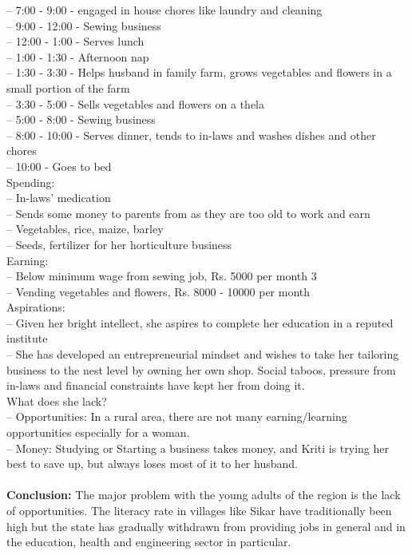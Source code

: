 \documentclass{article}
\begin{document}
– 7:00 - 9:00 - engaged in house chores like laundry and cleaning\\
– 9:00 - 12:00 - Sewing business\\
– 12:00 - 1:00 - Serves lunch\\
– 1:00 - 1:30 - Afternoon nap\\
– 1:30 - 3:30 - Helps husband in family farm, grows vegetables and
flowers in a small portion of the farm\\
– 3:30 - 5:00 - Sells vegetables and flowers on a thela\\
– 5:00 - 8:00 - Sewing business\\
– 8:00 - 10:00 - Serves dinner, tends to in-laws and washes dishes and
other chores\\
– 10:00 - Goes to bed\\
Spending:\\
– In-laws’ medication\\
– Sends some money to parents from as they are too old to work and
earn\\
– Vegetables, rice, maize, barley\\
– Seeds, fertilizer for her horticulture business\\
Earning:\\
– Below minimum wage from sewing job, Rs. 5000 per month
3\\
– Vending vegetables and flowers, Rs. 8000 - 10000 per month\\
Aspirations:\\
– Given her bright intellect, she aspires to complete her education in a
reputed institute\\
– She has developed an entrepreneurial mindset and wishes to take her
tailoring business to the nest level by owning her own shop. Social
taboos, pressure from in-laws and financial constraints have kept her
from doing it.\\
What does she lack?\\
– Opportunities: In a rural area, there are not many earning/learning
opportunities especially for a woman.\\
– Money: Studying or Starting a business takes money, and Kriti is
trying her best to save up, but always loses most of it to her husband.\\\\
\textbf{Conclusion:} The major problem with the young adults of the region is the lack of opportunities. The literacy rate in villages like Sikar have traditionally been high but the state has gradually withdrawn from providing jobs in general and in the education, health and engineering sector in particular.\\
\end{document}
